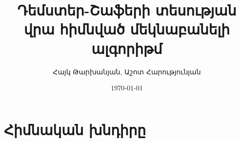 \documentclass[aspectratio=169]{beamer}
\title{Դեմստեր-Շաֆերի տեսության վրա հիմնված մեկնաբանելի ալգորիթմ}
\author{Հայկ Թարխանյան, Աշոտ Հարությունյան}
\date{\today}
\begin{document}
\begin{frame}
  \titlepage
\end{frame}

\begin{frame}
{\small\tableofcontents}
\end{frame}


\section{Հիմնական խնդիրը}
\end{document}
